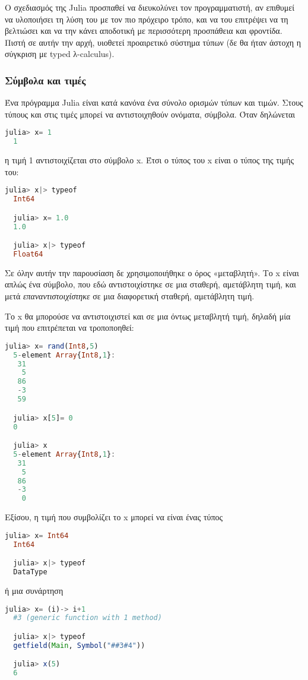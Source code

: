   Ο σχεδιασμός της Julia προσπαθεί να διευκολύνει τον προγραμματιστή, αν επιθυμεί να υλοποιήσει τη λύση του με τον πιο πρόχειρο τρόπο,
  και να του επιτρέψει να τη βελτιώσει και να την κάνει αποδοτική με περισσότερη προσπάθεια και φροντίδα.
  Πιστή σε αυτήν την αρχή, υιοθετεί προαιρετικό σύστημα τύπων (δε θα ήταν άστοχη η σύγκριση με typed λ-calculus).

  \subsubsection{Σύμβολα και τιμές}

  Ένα πρόγραμμα Julia είναι κατά κανόνα ένα σύνολο ορισμών τύπων και τιμών. Στους τύπους και στις τιμές μπορεί να αντιστοιχηθούν ονόματα, σύμβολα. Όταν δηλώνεται
  \begin{lstlisting}[language=julia]
  julia> x= 1
  1
  \end{lstlisting}
  η τιμή 1 αντιστοιχίζεται στο σύμβολο x.
  Έτσι ο τύπος του x είναι ο τύπος της τιμής του:
  \begin{lstlisting}[language=julia]
  julia> x|> typeof
  Int64

  julia> x= 1.0
  1.0

  julia> x|> typeof
  Float64
  \end{lstlisting}
  Σε όλην αυτήν την παρουσίαση δε χρησιμοποιήθηκε ο όρος «μεταβλητή». Το x είναι απλώς ένα σύμβολο, που εδώ αντιστοιχίστηκε σε μια σταθερή, αμετάβλητη τιμή,
  και μετά \textit{επαναντιστοιχίστηκε} σε μια διαφορετική σταθερή, αμετάβλητη τιμή.

  Το x θα μπορούσε να αντιστοιχιστεί και σε μια όντως μεταβλητή τιμή, δηλαδή μία τιμή που επιτρέπεται να τροποποηθεί:
  \begin{lstlisting}[language=julia]
  julia> x= rand(Int8,5)
  5-element Array{Int8,1}:
   31
    5
   86
   -3
   59

  julia> x[5]= 0
  0

  julia> x
  5-element Array{Int8,1}:
   31
    5
   86
   -3
    0
  \end{lstlisting}

  Εξίσου, η τιμή που συμβολίζει το x μπορεί να είναι ένας τύπος
  \begin{lstlisting}[language=julia]
  julia> x= Int64
  Int64

  julia> x|> typeof
  DataType
  \end{lstlisting}
  ή μια συνάρτηση
  \begin{lstlisting}[language=julia]
  julia> x= (i)-> i+1
  #3 (generic function with 1 method)

  julia> x|> typeof
  getfield(Main, Symbol("##3#4"))

  julia> x(5)
  6
  \end{lstlisting}

